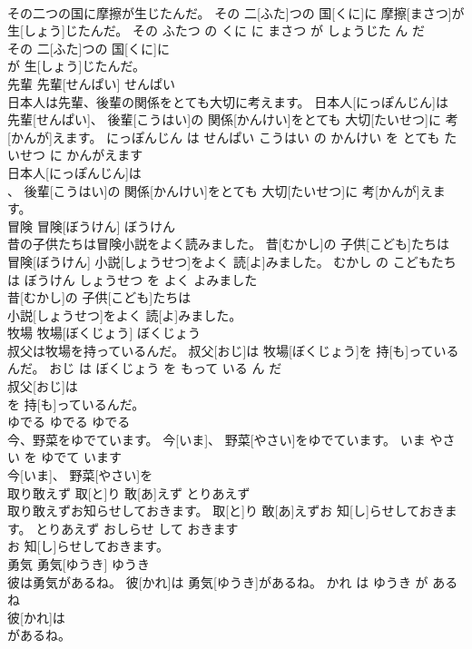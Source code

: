 \documentclass[8pt]{extreport}
\begin{document}
\begin{CJK}{UTF8}{min}
\\	その二つの国に摩擦が生じたんだ。	その 二[ふた]つの 国[くに]に 摩擦[まさつ]が 生[しょう]じたんだ。	その ふたつ の くに に まさつ が しょうじた ん だ	
\\	その 二[ふた]つの 国[くに]に
\\	が 生[しょう]じたんだ。			
\\	先輩	先輩[せんぱい]	せんぱい	
\\	日本人は先輩、後輩の関係をとても大切に考えます。	日本人[にっぽんじん]は 先輩[せんぱい]、 後輩[こうはい]の 関係[かんけい]をとても 大切[たいせつ]に 考[かんが]えます。	にっぽんじん は せんぱい こうはい の かんけい を とても たいせつ に かんがえます	
\\	日本人[にっぽんじん]は
\\	、 後輩[こうはい]の 関係[かんけい]をとても 大切[たいせつ]に 考[かんが]えます。			
\\	冒険	冒険[ぼうけん]	ぼうけん	
\\	昔の子供たちは冒険小説をよく読みました。	昔[むかし]の 子供[こども]たちは 冒険[ぼうけん] 小説[しょうせつ]をよく 読[よ]みました。	むかし の こどもたち は ぼうけん しょうせつ を よく よみました	
\\	昔[むかし]の 子供[こども]たちは
\\	小説[しょうせつ]をよく 読[よ]みました。			
\\	牧場	牧場[ぼくじょう]	ぼくじょう	
\\	叔父は牧場を持っているんだ。	叔父[おじ]は 牧場[ぼくじょう]を 持[も]っているんだ。	おじ は ぼくじょう を もって いる ん だ	
\\	叔父[おじ]は
\\	を 持[も]っているんだ。			
\\	ゆでる	ゆでる	ゆでる	
\\	今、野菜をゆでています。	今[いま]、 野菜[やさい]をゆでています。	いま やさい を ゆでて います	
\\	今[いま]、 野菜[やさい]を
\\	取り敢えず	取[と]り 敢[あ]えず	とりあえず	
\\	取り敢えずお知らせしておきます。	取[と]り 敢[あ]えずお 知[し]らせしておきます。	とりあえず おしらせ して おきます	
\\	お 知[し]らせしておきます。			
\\	勇気	勇気[ゆうき]	ゆうき	
\\	彼は勇気があるね。	彼[かれ]は 勇気[ゆうき]があるね。	かれ は ゆうき が ある ね	
\\	彼[かれ]は
\\	があるね。			

\end{CJK}
\end{document}
